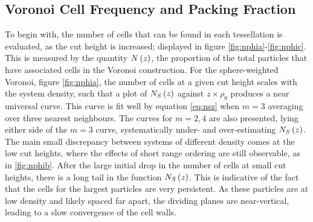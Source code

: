 \subsection{Voronoi Cell Frequency and Packing Fraction}
\label{s:polycell}

To begin with, the number of cells that can be found in each tessellation is evaluated, as the cut height is increased; displayed in figure \ref{fig:nphia}\--\ref{fig:nphic}.
This is measured by the quantity $N\left(z\right)$, the proportion of the total particles that have associated cells in the Voronoi construction.
For the sphere\--weighted Voronoi, figure \ref{fig:nphia}, the number of cells at a given cut height scales with the system density, such that a plot of $N_S\left(z\right)$ against $z\times \rho_0$ produces a near universal curve.
This curve is fit well by equation \eqref{eq:nsz} when $m=3$ \ie{} averaging over three nearest neighbours.
The curves for $m=2,4$ are also presented, lying either side of the $m=3$ curve, systematically under\-- and over\--estimating $N_S\left(z\right)$.
The main small discrepancy between systems of different density comes at the low cut heights, where the effects of short range ordering are still observable, as in \ref{fig:nphib}.
After the large initial drop in the number of cells at small cut heights, there is a long tail in the function $N_S\left(z\right)$.
This is indicative of the fact that the cells for the largest particles are very persistent.
As these particles are at low density and likely spaced far apart, the dividing planes are near\--vertical, leading to a slow convergence of the cell walls.

